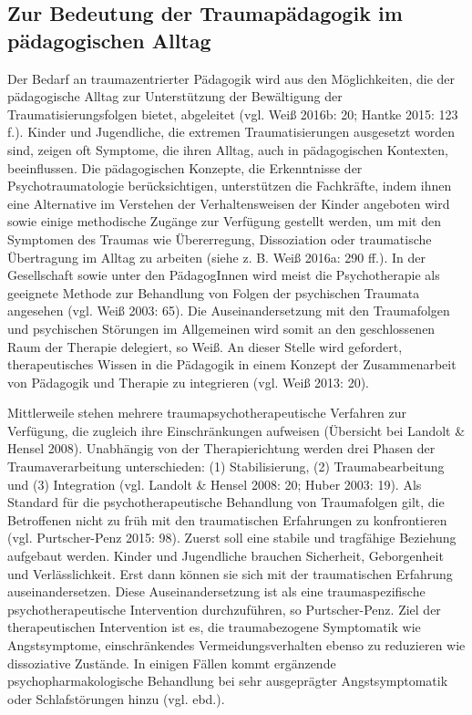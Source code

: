 \subsection{Zur Bedeutung der Traumapädagogik im pädagogischen Alltag}
Der Bedarf an traumazentrierter Pädagogik wird aus den Möglichkeiten, die der pädagogische Alltag zur Unterstützung der Bewältigung der Traumatisierungsfolgen bietet, abgeleitet (vgl. Weiß 2016b: 20; Hantke 2015: 123 f.). Kinder und Jugendliche, die extremen Traumatisierungen ausgesetzt worden sind, zeigen oft Symptome, die ihren Alltag, auch in pädagogischen Kontexten, beeinflussen. Die pädagogischen Konzepte, die Erkenntnisse der Psychotraumatologie berücksichtigen, unterstützen die Fachkräfte, indem ihnen eine Alternative im Verstehen der Verhaltensweisen der Kinder angeboten wird sowie einige methodische Zugänge zur Verfügung gestellt werden, um mit den Symptomen des Traumas wie Übererregung, Dissoziation oder traumatische Übertragung im Alltag zu arbeiten (siehe z. B. Weiß 2016a: 290 ff.). In der Gesellschaft sowie unter den PädagogInnen wird meist die Psychotherapie als geeignete Methode zur Behandlung von Folgen der psychischen Traumata angesehen (vgl. Weiß 2003: 65). Die Auseinandersetzung mit den Traumafolgen und psychischen Störungen im Allgemeinen wird somit an den geschlossenen Raum der Therapie delegiert, so Weiß. An dieser Stelle wird gefordert, therapeutisches Wissen in die P{\"a}dagogik in einem Konzept der Zusammenarbeit von P{\"a}dagogik und Therapie zu integrieren (vgl. Weiß 2013: 20).

Mittlerweile stehen mehrere traumapsychotherapeutische Verfahren zur Verfügung, die zugleich ihre Einschränkungen aufweisen (Übersicht bei Landolt \& Hensel 2008). Unabhängig von der Therapierichtung werden drei Phasen der Traumaverarbeitung unterschieden: (1) Stabilisierung, (2) Traumabearbeitung und (3) Integration (vgl. Landolt \& Hensel 2008: 20; Huber 2003: 19). Als Standard für die psychotherapeutische Behandlung von Traumafolgen gilt, die Betroffenen nicht zu früh mit den traumatischen Erfahrungen zu konfrontieren (vgl. Purtscher-Penz 2015: 98). Zuerst soll eine stabile und tragfähige Beziehung aufgebaut werden. Kinder und Jugendliche brauchen Sicherheit, Geborgenheit und Verlässlichkeit. Erst dann können sie sich mit der traumatischen Erfahrung auseinandersetzen. Diese Auseinandersetzung ist als eine traumaspezifische psychotherapeutische Intervention durchzuführen, so Purtscher-Penz. Ziel der therapeutischen Intervention ist es, die traumabezogene Symptomatik wie Angstsymptome, einschränkendes Vermeidungsverhalten ebenso zu reduzieren wie dissoziative Zustände. In einigen Fällen kommt ergänzende psychopharmakologische Behandlung bei sehr ausgeprägter Angstsymptomatik oder Schlafstörungen hinzu (vgl. ebd.).  

